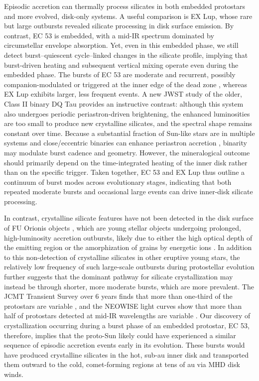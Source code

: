\documentclass[pdflatex,sn-mathphys-num]{sn-jnl}
\theoremstyle{thmstyleone}
\theoremstyle{thmstyletwo}
\theoremstyle{thmstylethree}
\begin{document}
\begin{bibunit}
Episodic accretion can thermally process silicates in both embedded protostars and more evolved, disk-only systems. A useful comparison is EX Lup, whose rare but large outbursts revealed silicate processing in disk surface emission. By contrast, EC 53 is embedded, with a mid-IR spectrum dominated by circumstellar envelope absorption. Yet, even in this embedded phase, we still detect burst–quiescent cycle–linked changes in the silicate profile, implying that burst-driven heating and subsequent vertical mixing operate even during the embedded phase. The bursts of EC 53 are moderate and recurrent, possibly companion-modulated or triggered at the inner edge of the dead zone \citep[e.g.,][]{Cecil2024}, whereas EX Lup exhibits larger, less frequent events. A new JWST study of the older, Class II binary DQ Tau \citep{kospal2025} provides an instructive contrast: although this system also undergoes periodic periastron-driven brightening, the enhanced luminosities are too small to produce new crystalline silicates, and the spectral shape remains constant over time.
Because a substantial fraction of Sun-like stars are in multiple systems and close/eccentric binaries can enhance periastron accretion \citep{Zagaria2022, kospal2025}, binarity may modulate burst cadence and geometry. However, the mineralogical outcome should primarily depend on the time-integrated heating of the inner disk rather than on the specific trigger. Taken together, EC 53 and EX Lup thus outline a continuum of burst modes across evolutionary stages, indicating that both repeated moderate bursts and occasional large events can drive inner-disk silicate processing.

In contrast, crystalline silicate features have not been detected in the disk surface of FU Orionis objects \citep{Green2006, Quanz2007, Kospal2020}, which are young stellar objects undergoing prolonged, high-luminosity accretion outbursts, likely due to either the high optical depth of the emitting region or the amorphization of grains by energetic ions \citep{Glauser2009}.
In addition to this non-detection of crystalline silicates in other eruptive young stars, the relatively low frequency of such large-scale outbursts during protostellar evolution \citep{Fischer2023} further suggests that the dominant pathway for silicate crystallization may instead be through shorter, more moderate bursts, which are more prevalent.
The JCMT Transient Survey over 6 years finds that more than one-third of the protostars are variable \citep{Mairs2024}, and the NEOWISE light curves show that more than half of protostars detected at mid-IR wavelengths are variable \citep{Park2021}.
Our discovery of crystallization occurring during a burst phase of an embedded protostar, EC 53, therefore, implies that the proto-Sun likely could have experienced a similar sequence of episodic accretion events early in its evolution. These bursts would have produced crystalline silicates in the hot, sub-au inner disk and transported them outward to the cold, comet-forming regions at tens of au via MHD disk winds.

\renewcommand\refname{References}
\putbib
\end{bibunit}
\end{document}
